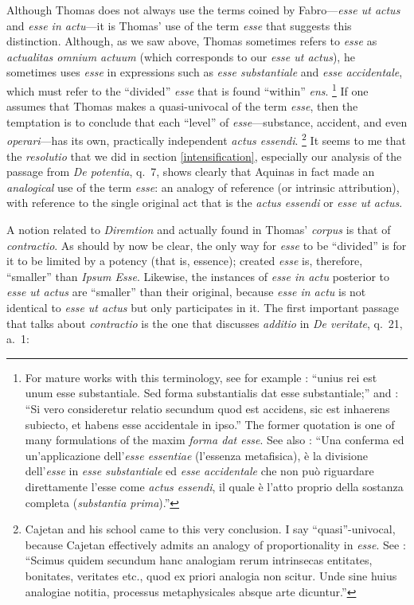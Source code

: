 Although Thomas does not always use the terms coined by Fabro---\emph{esse ut actus} and \emph{esse in actu}---it is Thomas' use of the term \emph{esse} that suggests this distinction. Although, as we saw above, Thomas sometimes refers to \emph{esse} as \emph{actualitas omnium actuum} (which corresponds to our \emph{esse ut actus}), he sometimes uses \emph{esse} in expressions such as \emph{esse substantiale} and \emph{esse accidentale}, which must refer to the ``divided'' \emph{esse} that is found ``within'' \emph{ens}.%
%
\footnote{For mature works with this terminology, see for example \cite[I, q.~76, a.~4, s.c.:]{st:summa}: ``unius rei est unum esse substantiale. Sed forma substantialis dat esse substantiale;''  and \cite[I, q.~28, a.~2, co.:]{st:summa}: ``Si vero consideretur relatio secundum quod est accidens, sic est inhaerens subiecto, et habens esse accidentale in ipso.'' The former quotation is one of many formulations of the maxim \emph{forma dat esse}. See also \cite[199]{fabro:partecipazione}: ``Una conferma ed un'applicazione dell'\emph{esse essentiae} (l'essenza metafisica), è la divisione dell'\emph{esse} in \emph{esse substantiale} ed \emph{esse accidentale} che non può riguardare direttamente l'esse come \emph{actus essendi}, il quale è l'atto proprio della sostanza completa (\emph{substantia prima}).''}
%
If one assumes that Thomas makes a quasi-univocal of the term \emph{esse}, then the temptation is to conclude that each ``level'' of \emph{esse}---substance, accident, and even \emph{operari}---has its own, practically independent \emph{actus essendi}.%
%
\footnote{Cajetan and his school came to this very conclusion. I say ``quasi''-univocal, because Cajetan effectively admits an analogy of proportionality in \emph{esse}. See \cite[III, n.~29]{cajetan:denominum}: ``Scimus quidem secundum hanc analogiam rerum intrinsecas entitates, bonitates, veritates etc., quod ex priori analogia non scitur. Unde sine huius analogiae notitia, processus metaphysicales absque arte dicuntur.''}
%
It seems to me that the \emph{resolutio} that we did in section \ref{intensification}, especially our analysis of the passage from \emph{De potentia}, q.~7, shows clearly that Aquinas in fact made an \emph{analogical} use of the term \emph{esse}: an analogy of reference (or intrinsic attribution), with reference to the single original act that is the \emph{actus essendi} or \emph{esse ut actus}.

A notion related to \emph{Diremtion} and actually found in Thomas' \emph{corpus} is that of \emph{contractio}. As should by now be clear, the only way for \emph{esse} to be  ``divided'' is for it to be limited by a potency (that is, essence); created \emph{esse} is, therefore, ``smaller'' than \emph{Ipsum Esse}. Likewise, the instances of \emph{esse in actu} posterior to \emph{esse ut actus} are ``smaller'' than their original, because \emph{esse in actu} is not identical to \emph{esse ut actus} but only participates in it. The first important passage that talks about \emph{contractio} is the one that discusses \emph{additio} in \emph{De veritate}, q.~21, a.~1:

